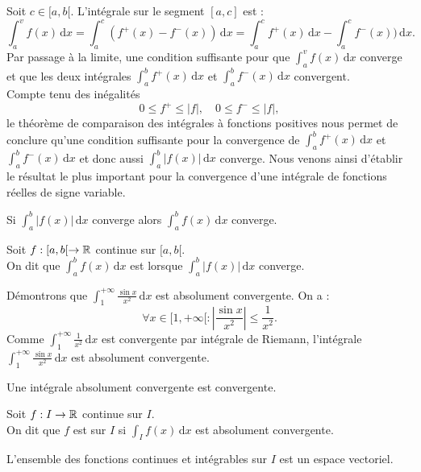 \documentclass{book}
\begin{document}
Soit $c\in [a,b[$. L'intégrale sur le segment $[a,c]$ est :
$$ \int_a^v f(x)\,\mathrm dx= \int_a^c (f^+(x)-f^-(x))\,\mathrm dx = \int_a^c f^+(x)\,\mathrm dx -  \int_a^c f^-(x))\,\mathrm dx.$$
Par passage à la limite, une condition suffisante pour que $\int_a^v f(x)\,\mathrm dx$ converge  et que les deux intégrales $\int_a^b f^+(x)\,\mathrm dx$  et $\int_a^b f^-(x)\,\mathrm dx$ convergent. \\
Compte tenu des inégalités $$0\leq f^+ \leq |f| , \quad 0\leq f^- \leq |f|,$$ le
théorème de comparaison des intégrales à fonctions positives nous permet de conclure qu'une
condition suffisante pour la convergence de $\int_a^b f^+(x)\,\mathrm dx$ et $\int_a^b f^-(x)\,\mathrm dx$
et donc aussi $\int_a^b |f(x)|\,\mathrm dx$ converge. Nous venons ainsi d'établir le résultat le plus important pour
la convergence d'une intégrale de fonctions réelles de signe variable.
\begin{Theoreme}
Si $\int_a^b |f(x)|\,\mathrm dx$ converge alors $\int_a^b f(x)\,\mathrm dx$ converge.
\end{Theoreme}
\begin{Definition}
Soit $f : [a,b [\to \mathbb{R}$ continue sur $[a,b[$.\\
On dit que $\int_a^b f(x)\,\mathrm dx$ est  lorsque 
$\int_a^b |f(x)|\,\mathrm dx$ converge.
\end{Definition}
\begin{Exemple} Démontrons que  $\int_1^{+\infty } \frac{\sin x}{x^2}\,\mathrm dx$ est absolument convergente. On a :
$$\forall x \in [1,{+\infty }[ : \left| \frac{\sin x}{x^2}\right|\leq \frac{1}{x^2}.$$ 
Comme  $\int_1^{+\infty}\frac{1}{x^2 }\,\mathrm dx$ est convergente par intégrale de Riemann, l'intégrale $\int_1^{+\infty } \frac{\sin x}{x^2}\,\mathrm dx$ est absolument convergente.
\end{Exemple}
\begin{Theoreme}
Une intégrale absolument convergente est convergente.
\end{Theoreme}
\begin{Definition}[Intégrable]
Soit $f : I\to \mathbb{R}$ continue sur $I$.\\
On dit que $f$ est  sur $I$ si 
$\int_I f(x)\,\mathrm dx$ est absolument convergente.
\end{Definition}
\begin{Proposition}
L'ensemble des fonctions continues et intégrables sur $I$ est un espace vectoriel.
\end{Proposition}
\end{document}
